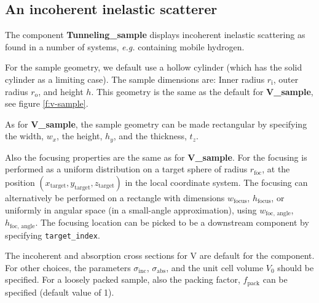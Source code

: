 \subsection*{An incoherent inelastic scatterer}
\label{s:Tunneling_sample}



The component \textbf{Tunneling\_sample}
displays incoherent inelastic scattering as found in a number of systems, {\em e.g.}
containing mobile hydrogen. 

For the sample geometry, we default use a
hollow cylinder (which has the solid cylinder as a limiting case).
The sample dimensions are: Inner radius $r_\textrm{i}$,
outer radius $r_\textrm{o}$, and height $h$. This geometry is the same as 
the default for \textbf{V\_sample}, see figure \ref{f:v-sample}.

As for \textbf{V\_sample}, the sample geometry can be made rectangular 
by specifying the width, $w_x$, the height, $h_y$, and the thickness, $t_z$.

Also the focusing properties are the same as for \textbf{V\_sample}.
For the focusing is performed as a uniform distribution on
a target sphere of radius $r_\textrm{foc}$, at the position
$(x_\textrm{target},y_\textrm{target},z_\textrm{target})$
in the local coordinate system.
The focusing can alternatively be performed on a rectangle with dimensions
$w_\textrm{focus}$, $h_\textrm{focus}$, or uniformly in angular space
(in a small-angle approximation),
using $w_\textrm{foc, angle}$, $h_\textrm{foc, angle}$.
The focusing location can be picked to be a downstream component by
specifying \verb+target_index+.

The incoherent and absorption cross sections for V are default
for the component. For other choices, the
parameters $\sigma_\textrm{inc}$, $\sigma_\textrm{abs}$,
and the unit cell volume $V_0$ should be specified.
For a loosely packed sample, also the packing factor, $f_\textrm{pack}$
can be specified (default value of 1).

